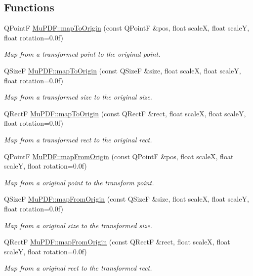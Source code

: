 \subsection*{Functions}
\begin{DoxyCompactItemize}
\item 
Q\-Point\-F \hyperlink{namespace_mu_p_d_f_a40833e5e56d0d7d44cba455e4186d5e4}{Mu\-P\-D\-F\-::map\-To\-Origin} (const Q\-Point\-F \&pos, float scale\-X, float scale\-Y, float rotation=0.\-0f)
\begin{DoxyCompactList}\small\item\em Map from a transformed point to the original point. \end{DoxyCompactList}\item 
Q\-Size\-F \hyperlink{namespace_mu_p_d_f_ae91a73bb4e3e4c10eb54c07ab9be9cf7}{Mu\-P\-D\-F\-::map\-To\-Origin} (const Q\-Size\-F \&size, float scale\-X, float scale\-Y, float rotation=0.\-0f)
\begin{DoxyCompactList}\small\item\em Map from a transformed size to the original size. \end{DoxyCompactList}\item 
Q\-Rect\-F \hyperlink{namespace_mu_p_d_f_a2132cae17dab8f9896ec0c83f0c2173c}{Mu\-P\-D\-F\-::map\-To\-Origin} (const Q\-Rect\-F \&rect, float scale\-X, float scale\-Y, float rotation=0.\-0f)
\begin{DoxyCompactList}\small\item\em Map from a transformed rect to the original rect. \end{DoxyCompactList}\item 
Q\-Point\-F \hyperlink{namespace_mu_p_d_f_ad849bcc678dd57c1f12619f9554e6aba}{Mu\-P\-D\-F\-::map\-From\-Origin} (const Q\-Point\-F \&pos, float scale\-X, float scale\-Y, float rotation=0.\-0f)
\begin{DoxyCompactList}\small\item\em Map from a original point to the transform point. \end{DoxyCompactList}\item 
Q\-Size\-F \hyperlink{namespace_mu_p_d_f_a6c6cac36e5a30ed75952a619b19d33aa}{Mu\-P\-D\-F\-::map\-From\-Origin} (const Q\-Size\-F \&size, float scale\-X, float scale\-Y, float rotation=0.\-0f)
\begin{DoxyCompactList}\small\item\em Map from a original size to the transformed size. \end{DoxyCompactList}\item 
Q\-Rect\-F \hyperlink{namespace_mu_p_d_f_a2f2a28dce44170175d3e9ba9601478ea}{Mu\-P\-D\-F\-::map\-From\-Origin} (const Q\-Rect\-F \&rect, float scale\-X, float scale\-Y, float rotation=0.\-0f)
\begin{DoxyCompactList}\small\item\em Map from a original rect to the transformed rect. \end{DoxyCompactList}\end{DoxyCompactItemize}
